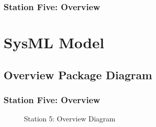 \documentclass{beamer}
\begin{document}
\begin{frame}[fragile]
\frametitle{Station Five: Overview}
\begin{figure}
	\centering
	\label{fig:stat56}
\end{figure}
\end{frame}
\section{SysML Model}
\subsection{Overview Package Diagram}
\begin{frame}[fragile]
\frametitle{Station Five: Overview}
\begin{figure}
	\centering
	\caption{Station 5: Overview Diagram}
	\label{dia:overview}
\end{figure}
\end{frame}
\end{document}
